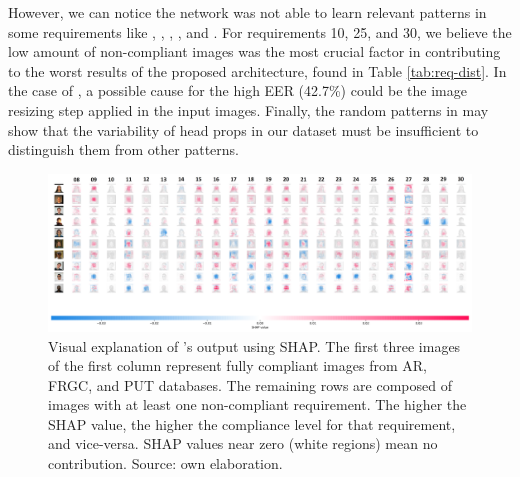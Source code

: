 However, we can notice the network was not able to learn relevant patterns in some requirements like \citeReq{\inkmarked}, \citeReq{\pixelation}, \citeReq{\framestooheavy}, \citeReq{\hatcap}, and \citeReq{\otherfacesortoys}. For requirements 10, 25, and 30, we believe the low amount of non-compliant images was the most crucial factor in contributing to the worst results of the proposed architecture, found in Table \ref{tab:req-dist}. In the case of \citeReq{\pixelation}, a possible cause for the high EER (42.7\%) could be the image resizing step applied in the input images. Finally, the random patterns in \citeReq{\hatcap} may show that the variability of head props in our dataset must be insufficient to distinguish them from other patterns. 

\begin{landscape}
\begin{figure}[t]
\centering
\includegraphics[width=\linewidth]{images/shap.png}
\caption{Visual explanation of \methodname's output using SHAP. The first three images of the first column represent fully compliant images from AR, FRGC, and PUT databases. The remaining rows are composed of images with at least one non-compliant requirement. The higher the SHAP value, the higher the compliance level for that requirement, and vice-versa. SHAP values near zero (white regions) mean no contribution. Source: own elaboration.}
    \label{fig:shap}
\end{figure}
\end{landscape}
